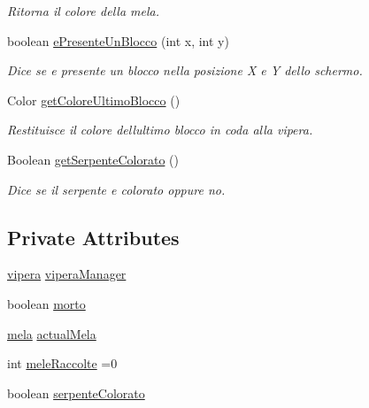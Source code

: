 \begin{DoxyCompactItemize}
\begin{DoxyCompactList}\small\item\em Ritorna il colore della mela. \end{DoxyCompactList}\item 
boolean \mbox{\hyperlink{class_snake_1_1game_1_1utility_1_1game_manager_ac24833a417b3bd7c60e29ed5b7edc29f}{e\+Presente\+Un\+Blocco}} (int x, int y)
\begin{DoxyCompactList}\small\item\em Dice se e\textquotesingle{} presente un blocco nella posizione X e Y dello schermo. \end{DoxyCompactList}\item 
Color \mbox{\hyperlink{class_snake_1_1game_1_1utility_1_1game_manager_a1afbc9b85396f53e6180eab2e5a36d4d}{get\+Colore\+Ultimo\+Blocco}} ()
\begin{DoxyCompactList}\small\item\em Restituisce il colore dell\textquotesingle{}ultimo blocco in coda alla vipera. \end{DoxyCompactList}\item 
Boolean \mbox{\hyperlink{class_snake_1_1game_1_1utility_1_1game_manager_adf69d52c2b16c0b681a384f734f9dd0f}{get\+Serpente\+Colorato}} ()
\begin{DoxyCompactList}\small\item\em Dice se il serpente e\textquotesingle{} colorato oppure no. \end{DoxyCompactList}\end{DoxyCompactItemize}
\subsection*{Private Attributes}
\begin{DoxyCompactItemize}
\item 
\mbox{\hyperlink{class_snake_1_1game_1_1vipera_1_1vipera}{vipera}} \mbox{\hyperlink{class_snake_1_1game_1_1utility_1_1game_manager_ad03d565374455808665272d6365c9bca}{vipera\+Manager}}
\item 
boolean \mbox{\hyperlink{class_snake_1_1game_1_1utility_1_1game_manager_a415d6bb79054489c86349a855c1015be}{morto}}
\item 
\mbox{\hyperlink{class_snake_1_1game_1_1vipera_1_1mela}{mela}} \mbox{\hyperlink{class_snake_1_1game_1_1utility_1_1game_manager_a8ed97a1e91168bdb3e5d2dea4e59a977}{actual\+Mela}}
\item 
int \mbox{\hyperlink{class_snake_1_1game_1_1utility_1_1game_manager_a6ccf94c481d483cdef8cca4743754db4}{mele\+Raccolte}} =0
\item 
boolean \mbox{\hyperlink{class_snake_1_1game_1_1utility_1_1game_manager_a23cfb877f1f20af97a29e6f61424aa80}{serpente\+Colorato}}
\end{DoxyCompactItemize}


